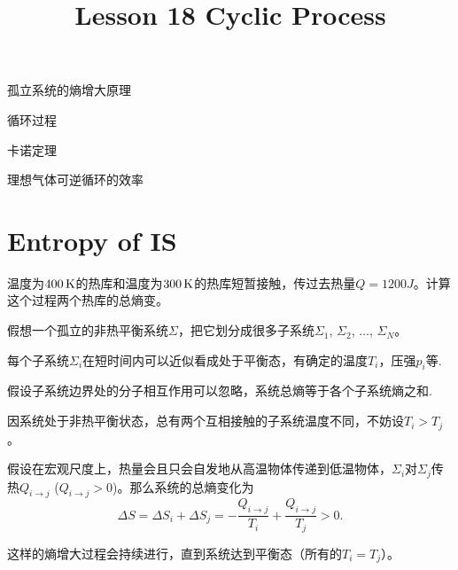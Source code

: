 \documentclass[CJK]{beamer}
\title{Lesson 18 Cyclic Process}
\author{}
\date{}
\begin{document}


\begin{frame}
\bchL
\bitem
\item{孤立系统的熵增大原理}
\item{循环过程}
\item{卡诺定理}  
\item{理想气体可逆循环的效率}
\eitem
\echL
\end{frame}

\section{Entropy of IS}


\begin{frame}
  \bchL

  温度为$400\,\mathrm{K}$的热库和温度为$300\,\mathrm{K}$的热库短暂接触，传过去热量$Q = 1200J$。计算这个过程两个热库的总熵变。
  \echL
\end{frame}

\begin{frame}
\bchL
假想一个孤立的非热平衡系统$\Sigma$，把它划分成很多子系统$\Sigma_1$, $\Sigma_2$, $\ldots$, $\Sigma_N$。



\emini
{}
每个子系统$\Sigma_i$在短时间内可以近似看成处于平衡态，有确定的温度$T_i$，压强$p_i$等.

\skipline

假设子系统边界处的分子相互作用可以忽略，系统总熵等于各个子系统熵之和.
\emini
\echL
\end{frame}

\begin{frame}
\bchL
因系统处于非热平衡状态，总有两个互相接触的子系统温度不同，不妨设$T_i>T_j$。

\skipline

假设{\blue 在宏观尺度上，热量会且只会自发地从高温物体传递到低温物体}，$\Sigma_i$对$\Sigma_j$传热$Q_{i\rightarrow j}$ ($Q_{i\rightarrow j}>0$)。那么系统的总熵变化为
$$\Delta S = \Delta S_i + \Delta S_j = - \frac{Q_{i\rightarrow j}}{T_i}+ \frac{Q_{i\rightarrow j}}{T_j}  > 0.$$

\skipline
这样的熵增大过程会持续进行，直到系统达到平衡态（所有的$T_i = T_j$）。

\echL
\end{frame}
\end{document}
